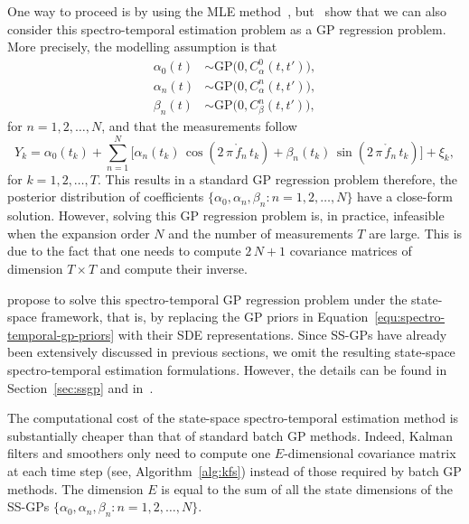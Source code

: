 One way to proceed is by using the MLE method~\citep{Bretthorst1988}, but~\citet{QiYuan2002, ZhaoZheng2018KF, ZhaoZheng2020KFECG} show that we can also consider this spectro-temporal estimation problem as a GP regression problem. More precisely, the modelling assumption is that
%
\begin{equation}
	\begin{split}
		\alpha_0(t) &\sim \mathrm{GP}\big(0, C^0_\alpha(t, t')\big),\\
		\alpha_n(t) &\sim \mathrm{GP}\big(0, C^n_\alpha(t, t')\big),\\
		\beta_n(t) &\sim \mathrm{GP}\big(0, C^n_\beta(t, t')\big),
		\label{equ:spectro-temporal-gp-priors}
	\end{split}
\end{equation}
%
for $n=1,2,\ldots, N$, and that the measurements follow
%
\begin{equation}
	Y_k = \alpha_0(t_k) + \sum^{N}_{n=1} \big[\alpha_n(t_k) \, \cos(2 \, \pi \, \mathring{f}_n \, t_k) + \beta_n(t_k) \, \sin(2 \, \pi \, \mathring{f}_n \, t_k)\big] + \xi_k,\nonumber
\end{equation}
%
for $k=1,2,\ldots,T$. This results in a standard GP regression problem therefore, the posterior distribution of coefficients $\lbrace \alpha_0, \alpha_n, \beta_n \colon n=1,2,\ldots, N \rbrace$ have a close-form solution. However, solving this GP regression problem is, in practice, infeasible when the expansion order $N$ and the number of measurements $T$ are large. This is due to the fact that one needs to compute $2\,N+1$ covariance matrices of dimension $T\times T$ and compute their inverse.

\citet{ZhaoZheng2018KF} propose to solve this spectro-temporal GP regression problem under the state-space framework, that is, by replacing the GP priors in Equation~\eqref{equ:spectro-temporal-gp-priors} with their SDE representations. Since SS-GPs have already been extensively discussed in previous sections, we omit the resulting state-space spectro-temporal estimation formulations. However, the details can be found in Section~\ref{sec:ssgp} and in~\citet{ZhaoZheng2018KF}.

The computational cost of the state-space spectro-temporal estimation method is substantially cheaper than that of standard batch GP methods. Indeed, Kalman filters and smoothers only need to compute one $E$-dimensional covariance matrix at each time step (see, Algorithm~\ref{alg:kfs}) instead of those required by batch GP methods. The dimension $E$ is equal to the sum of all the state dimensions of the SS-GPs $\lbrace \alpha_0, \alpha_n, \beta_n \colon n=1,2,\ldots, N \rbrace$. 

